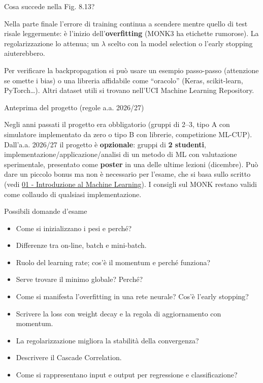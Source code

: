 \begin{boxquestion}{Cosa succede nella Fig. 8.13?}

Nella parte finale l'errore di training continua a scendere mentre
quello di test risale leggermente: è l'inizio dell'\textbf{overfitting}
(MONK3 ha etichette rumorose). La regolarizzazione lo attenua; un
\(\lambda\) scelto con la model selection o l'early stopping
aiuterebbero.

\end{boxquestion}

Per verificare la backpropagation si può usare un esempio passo-passo
(attenzione se omette i bias) o una libreria affidabile come ``oracolo''
(Keras, scikit-learn, PyTorch\ldots). Altri dataset utili si trovano
nell'UCI Machine Learning Repository.

\begin{boxnote}{Anteprima del progetto (regole a.a. 2026/27)}

Negli anni passati il progetto era obbligatorio (gruppi di 2--3, tipo A
con simulatore implementato da zero o tipo B con librerie, competizione
ML-CUP). Dall'a.a. 2026/27 il progetto è \textbf{opzionale}: gruppi di
\textbf{2 studenti}, implementazione/applicazione/analisi di un metodo
di ML con valutazione sperimentale, presentato come \textbf{poster} in
una delle ultime lezioni (dicembre). Può dare un piccolo bonus ma non è
necessario per l'esame, che si basa sullo scritto (vedi
\href{01\%20-\%20Introduzione\%20al\%20Machine\%20Learning}{01 -
Introduzione al Machine Learning}). I consigli sul MONK restano validi
come collaudo di qualsiasi implementazione.

\end{boxnote}

\begin{boxquestion}{Possibili domande d'esame}

\begin{itemize}
\tightlist
\item
  Come si inizializzano i pesi e perché?
\item
  Differenze tra on-line, batch e mini-batch.
\item
  Ruolo del learning rate; cos'è il momentum e perché funziona?
\item
  Serve trovare il minimo globale? Perché?
\item
  Come si manifesta l'overfitting in una rete neurale? Cos'è l'early
  stopping?
\item
  Scrivere la loss con weight decay e la regola di aggiornamento con
  momentum.
\item
  La regolarizzazione migliora la stabilità della convergenza?
\item
  Descrivere il Cascade Correlation.
\item
  Come si rappresentano input e output per regressione e
  classificazione?
\end{itemize}

\end{boxquestion}
